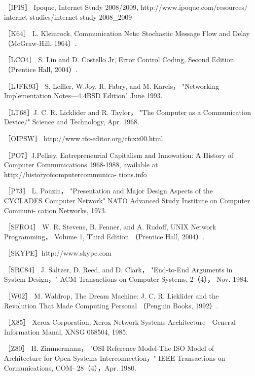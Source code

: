 ［IPIS］ Ipoque, Internet Study 2008/2009, http://www.ipoque.com/resources/
internet-studies/internet-study-2008_2009

［K64］ L. Kleinrock, Communication Nets: Stochastic Message Flow and Delay
（McGraw-Hill, 1964）.

［LCO4］ S. Lin and D. Costello Jr, Error Control Coding, Second Edition （Prentice
Hall, 2004）.

［LJFK93］ S. Leffler, W.Joy, R. Fabry, and M. Karels， "Networking Implementation
Notes—4.4BSD Edition" June 1993.

［LT68］J. C. R. Licklider and R. Taylor， "The Computer as a Communication
Device/" Science and Technology, Apr. 1968.

［OIPSW］ http://www.rfc-editor.org/rfcxx00.html

［PO7］J.Pelkey, Entrepreneurial Capitalism and Innowation: A History of Computer
Communications 1968-1988, available at http://historyofcomputercommunica-
tions.info

［P73］ L. Pouzin， "Presentation and Major Design Aspects of the CYCLADES
Computer Network" NATO Advanced Study Institute on Computer Communi-
cation Networks, 1973.

［SFRO4］ W. R. Stevens, B. Fenner, and A. Rudoff, UNIX Network Programming，
Volume 1, Third Edition （Prentice Hall, 2004）.

［SKYPE］http://www.skype.com

［SRC84］ J. Saltzer, D. Reed, and D. Clark， "End-to-End Arguments in System
Design，" ACM Transactions on Computer Systems, 2（4）， Nov. 1984.

［W02］ M. Waldrop, The Dream Machine: J. C. R. Licklider and the Revolution That
Made Computing Personal （Penguin Books, 1992）.

［X85］ Xerox Corporation, Xerox Network Systems Architecture—General Information
Manal, XNSG 068504, 1985.

［Z80］ H. Zimmermann， "OSI Reference Model-The ISO Model of Architecture
for Open Systems Interconnection，" IEEE Transactions on Cormunications, COM-
28（4），Apr. 1980.
\fi

